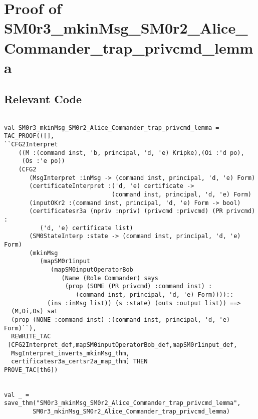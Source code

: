 \documentclass{report}
\begin{document}
\section{Proof of SM0r3_mkinMsg_SM0r2_Alice_Commander_trap_privcmd_lemma}
\label{proof-5}

\subsection{Relevant Code}
\label{rel-code-5}
\begin{lstlisting}[frame=TBlr]

val SM0r3_mkinMsg_SM0r2_Alice_Commander_trap_privcmd_lemma =
TAC_PROOF(([],
``CFG2Interpret
    ((M :(command inst, 'b, principal, 'd, 'e) Kripke),(Oi :'d po),
     (Os :'e po))
    (CFG2
       (MsgInterpret :inMsg -> (command inst, principal, 'd, 'e) Form)
       (certificateInterpret :('d, 'e) certificate ->
                              (command inst, principal, 'd, 'e) Form)
       (inputOKr2 :(command inst, principal, 'd, 'e) Form -> bool)
       (certificatesr3a (npriv :npriv) (privcmd :privcmd) (PR privcmd) :
          ('d, 'e) certificate list)
       (SM0StateInterp :state -> (command inst, principal, 'd, 'e) Form)
       (mkinMsg
          (mapSM0r1input
             (mapSM0inputOperatorBob
                (Name (Role Commander) says
                 (prop (SOME (PR privcmd) :command inst) :
                    (command inst, principal, 'd, 'e) Form))))::
            (ins :inMsg list)) (s :state) (outs :output list)) ==>
  (M,Oi,Os) sat
  (prop (NONE :command inst) :(command inst, principal, 'd, 'e) Form)``),
  REWRITE_TAC
 [CFG2Interpret_def,mapSM0inputOperatorBob_def,mapSM0r1input_def,
  MsgInterpret_inverts_mkinMsg_thm,
  certificatesr3a_certsr2a_map_thm] THEN
PROVE_TAC[th6])


val _ = save_thm("SM0r3_mkinMsg_SM0r2_Alice_Commander_trap_privcmd_lemma",
        SM0r3_mkinMsg_SM0r2_Alice_Commander_trap_privcmd_lemma)


\end{lstlisting}
\end{document}
